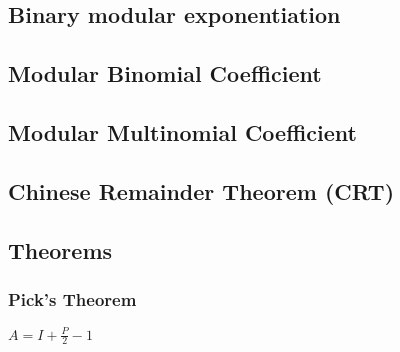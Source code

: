 \documentclass[10pt,landscape,twocolumn,a4paper,notitlepage]{article}
\begin{document}
  \subsection{Binary modular exponentiation}
  
  
  \subsection{Modular Binomial Coefficient}
  

  \subsection{Modular Multinomial Coefficient}
  

  \subsection{Chinese Remainder Theorem (CRT)}
  

  \subsection{Theorems}
  \subsubsection{Pick's Theorem}
  $A = I + \frac{P}{2} - 1$

%   

%   

%   
\end{document}

